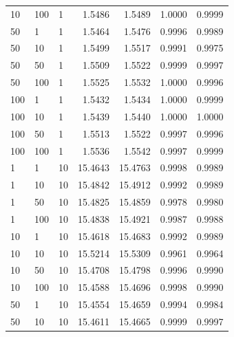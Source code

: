 \begin{table}[!htb]
\begin{center}
\begin{tabular}{l@{\hskip 0.5em}l@{\hskip 0.5em}l|r@{\hskip 0.5em}r@{\hskip 0.5em}r@{\hskip 0.5em}r}
    10 &             100 &                    1 &      1.5486 &     1.5489 &     1.0000 &    0.9999 \\
    50 &               1 &                    1 &      1.5464 &     1.5476 &     0.9996 &    0.9989 \\
    50 &              10 &                    1 &      1.5499 &     1.5517 &     0.9991 &    0.9975 \\
    50 &              50 &                    1 &      1.5509 &     1.5522 &     0.9999 &    0.9997 \\
    50 &             100 &                    1 &      1.5525 &     1.5532 &     1.0000 &    0.9996 \\
    100 &               1 &                    1 &      1.5432 &     1.5434 &     1.0000 &    0.9999 \\
    100 &              10 &                    1 &      1.5439 &     1.5440 &     1.0000 &    1.0000 \\
    100 &              50 &                    1 &      1.5513 &     1.5522 &     0.9997 &    0.9996 \\
    100 &             100 &                    1 &      1.5536 &     1.5542 &     0.9997 &    0.9999 \\
    1 &               1 &                   10 &     15.4643 &    15.4763 &     0.9998 &    0.9989 \\
    1 &              10 &                   10 &     15.4842 &    15.4912 &     0.9992 &    0.9989 \\
    1 &              50 &                   10 &     15.4825 &    15.4859 &     0.9978 &    0.9980 \\
    1 &             100 &                   10 &     15.4838 &    15.4921 &     0.9987 &    0.9988 \\
    10 &               1 &                   10 &     15.4618 &    15.4683 &     0.9992 &    0.9989 \\
    10 &              10 &                   10 &     15.5214 &    15.5309 &     0.9961 &    0.9964 \\
    10 &              50 &                   10 &     15.4708 &    15.4798 &     0.9996 &    0.9990 \\
    10 &             100 &                   10 &     15.4588 &    15.4696 &     0.9998 &    0.9990 \\
    50 &               1 &                   10 &     15.4554 &    15.4659 &     0.9994 &    0.9984 \\
    50 &              10 &                   10 &     15.4611 &    15.4665 &     0.9999 &    0.9997 \\

\end{tabular}
\end{center}
\end{table}
